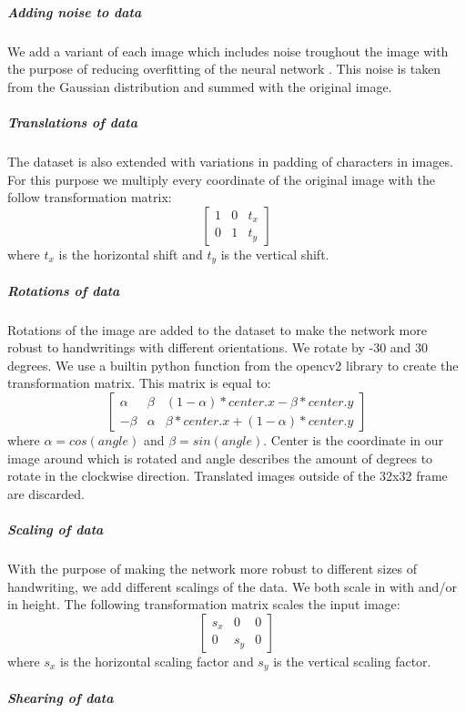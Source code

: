 \documentclass{article}
\begin{document}
\subparagraph{Adding noise to data}
We add a variant of each image which includes noise troughout the image with the purpose of reducing overfitting of the neural network \cite{DataNoise}. This noise is taken from the Gaussian distribution and summed with the original image.  
\subparagraph{Translations of data}
The dataset is also extended with variations in padding of characters in images. For this purpose we multiply every coordinate of the original image with the follow transformation matrix: 
\begin{equation}
        \begin{bmatrix}
                1 & 0 & t_x \\
                0 & 1 & t_y
        \end{bmatrix}
\end{equation}
where $t_x$ is the horizontal shift and $t_y$ is the vertical shift. 
\subparagraph{Rotations of data}
Rotations of the image are added to the dataset to make the network more robust to handwritings with different orientations. We rotate by -30 and 30 degrees. We use a builtin python function from the opencv2 library to create the transformation matrix. This matrix is equal to:
\begin{equation}
       \begin{bmatrix}
               \alpha & \beta & (1-\alpha)*center.x - \beta*center.y \\
               -\beta & \alpha & \beta*center.x + (1-\alpha)*center.y
       \end{bmatrix}
\end{equation}
where $\alpha = cos(angle)$ and $\beta = sin(angle)$. Center is the coordinate in our image around which is rotated and angle describes the amount of degrees to rotate in the clockwise direction. Translated images outside of the 32x32 frame are discarded.
\subparagraph{Scaling of data}
With the purpose of making the network more robust to different sizes of handwriting, we add different scalings of the data. We both scale in with and/or in height. The following transformation matrix scales the input image: 
\begin{equation}
       \begin{bmatrix}
               s_x & 0 & 0  \\
               0 & s_y & 0
       \end{bmatrix}
\end{equation}
where $s_x$ is the horizontal scaling factor and $s_y$ is the vertical scaling factor. 
\subparagraph{Shearing of data}
\end{document}
